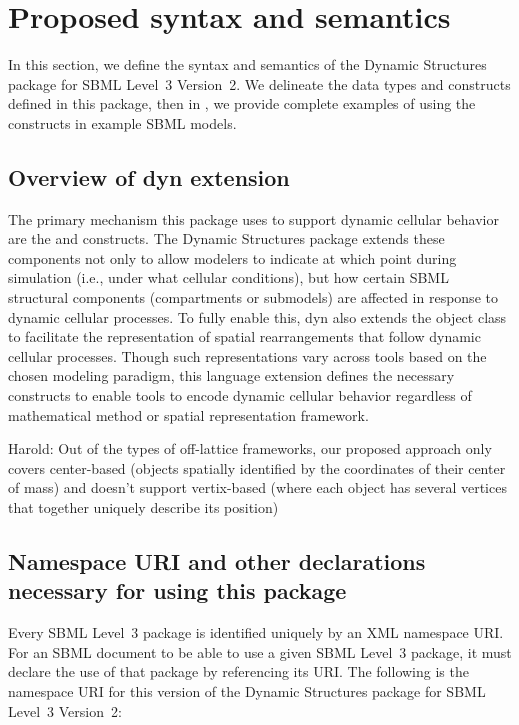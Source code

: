 
\section{Proposed syntax and semantics}
\label{sec:syntax}

In this section, we define the syntax and semantics of the Dynamic Structures package for SBML Level~3 Version~2. We delineate the data types and constructs defined in this package, then in , we provide complete examples of using the constructs in example SBML models.

\subsection{Overview of dyn extension}
\label{subsec:overview}

The primary mechanism this package uses to support dynamic cellular behavior are the \Event and \EventAssignment constructs. The Dynamic Structures package extends these components not only to allow modelers to indicate at which point during simulation (i.e., under what cellular conditions), but how certain SBML structural components (compartments or submodels) are affected in response to dynamic cellular processes. To fully enable this, dyn also extends the \Compartment object class to facilitate the representation of spatial rearrangements that follow dynamic cellular processes. Though such representations vary across tools based on the chosen modeling paradigm, this language extension defines the necessary constructs to enable tools to encode dynamic cellular behavior regardless of mathematical method or spatial representation framework.

{\color{red} Harold: \notice Out of the types of off-lattice frameworks, our proposed approach only covers center-based (objects spatially identified by the coordinates of their center of mass) and doesn't support vertix-based (where each object has several vertices that together uniquely describe its position)}

\subsection{Namespace URI and other declarations necessary for using this package}
\label{subsec:xml-namespace}

Every SBML Level~3 package is identified uniquely by an XML namespace URI.
For an SBML document to be able to use a given SBML Level~3 package, it
must declare the use of that package by referencing its URI.  The following
is the namespace URI for this version of the Dynamic Structures
package for SBML Level~3 Version~2:

